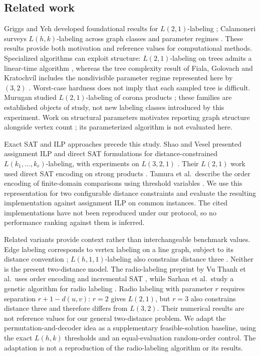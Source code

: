 \subsection{Related work}
Griggs and Yeh developed foundational results for $L(2,1)$-labeling
\cite{griggs}; Calamoneri surveys $L(h,k)$-labeling across graph classes
and parameter regimes \cite{calamoneri}. These results provide both
motivation and reference values for computational methods. Specialized
algorithms can exploit structure: $L(2,1)$-labeling on trees admits a
linear-time algorithm \cite{hasunuma}, whereas the tree complexity
result of Fiala, Golovach and Kratochv\'il includes the nondivisible
parameter regime represented here by $(3,2)$ \cite{fiala2008trees}.
Worst-case hardness does not imply that each sampled tree is difficult.
Murugan studied $L(2,1)$-labeling of corona products
\cite{murugan2015corona}; these families are established objects of study,
not new labeling classes introduced by this experiment. Work on structural
parameters motivates reporting graph structure alongside vertex count
\cite{fiala2018parameterized}; its parameterized algorithm is not evaluated here.

Exact SAT and ILP approaches precede this study. Shao and Vesel presented
assignment ILP and direct SAT formulations for distance-constrained
$L(k_1,\ldots,k_r)$-labeling, with experiments on $L(3,2,1)$
\cite{shao2013distance}. Their $L(2,1)$ work used direct SAT encoding on
strong products \cite{shao2014strong}. Tamura et al.\ describe the
order encoding of finite-domain comparisons using threshold variables
\cite{tamura2009order}. We use this representation for two configurable
distance constraints and evaluate the resulting implementation against
assignment ILP on common instances. The cited implementations have not
been reproduced under our protocol, so no performance ranking against
them is inferred.

Related variants provide context rather than interchangeable benchmark
values. Edge labeling corresponds to vertex labeling on a line graph,
subject to its distance convention \cite{berthe2023edge};
$L(h,1,1)$-labeling also constrains distance three \cite{king2010trees}.
Neither is the present two-distance model. The radio-labeling
preprint by Vu Thanh et al.\ uses order encoding and incremental SAT
\cite{vu2026radio}, while Sarhan et al.\ study a genetic algorithm for
radio labeling \cite{sarhan2026genetic}. Radio labeling with parameter
$r$ requires separation $r+1-d(u,v)$: $r=2$ gives $L(2,1)$, but $r=3$
also constrains distance three and therefore differs from $L(3,2)$.
Their numerical results are not reference values for our general
two-distance problem. We adapt the permutation-and-decoder idea as a
supplementary feasible-solution baseline, using the exact $L(h,k)$ thresholds
and an equal-evaluation random-order control. The adaptation is not a
reproduction of the radio-labeling algorithm or its results.

